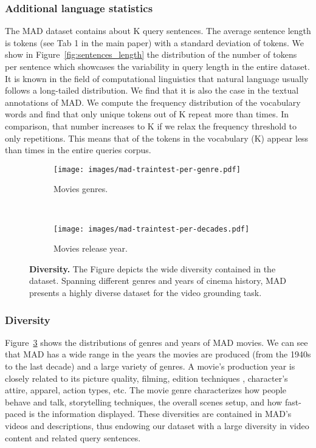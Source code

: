 \documentclass[10pt,twocolumn,letterpaper]{article}
\begin{document}
\subsubsection{Additional language statistics}
The MAD dataset contains about K query sentences. The average sentence length is  tokens (see Tab 1 in the main paper) with a standard deviation of  tokens. 
We show in Figure~\ref{fig:sentences_length} the distribution of the number of tokens per sentence which showcases the variability in query length in the entire dataset.
It is known in the field of computational linguistics that natural language usually follows a long-tailed distribution. We find that it is also the case in the textual annotations of MAD. We compute the frequency distribution of the vocabulary words and find that only  unique tokens out of K repeat more than  times. In comparison, that number increases to K if we relax the frequency threshold to only  repetitions. This means that  of the tokens in the vocabulary (K) appear less than  times in the entire queries corpus. 

\begin{figure}[t]
    \vspace{-0.5cm}
    \centering
    \begin{subfigure}[t]{0.8\linewidth}
        \centering
        \texttt{[image: images/mad-traintest-per-genre.pdf]}
        \caption{Movies genres.}
        \label{fig:genres}
    \end{subfigure}\\
    \begin{subfigure}[t]{0.8\linewidth}
        \centering
        \texttt{[image: images/mad-traintest-per-decades.pdf]}
        \caption{Movies release year.}
        \label{fig:years}
    \end{subfigure}\caption{\textbf{Diversity.} The Figure depicts the wide diversity contained in the dataset. Spanning  different genres and  years of cinema history, MAD presents a highly diverse dataset for the video grounding task. }
    \label{fig:dataset-statistics-supp}
    \vspace{-0.5cm}
\end{figure} 
\subsubsection{Diversity}
Figure~\ref{fig:dataset-statistics-supp} shows the distributions of genres and years of MAD movies. We can see that MAD has a wide range in the years the movies are produced (from the 1940s to the last decade) and a large variety of genres. A movie's production year is closely related to its picture quality, filming, edition techniques \cite{pardo2021moviecuts}, character's attire, apparel, action types, etc. The movie genre characterizes how people behave and talk, storytelling techniques, the overall scenes setup, and how fast-paced is the information displayed. These diversities are contained in MAD's videos and descriptions, thus endowing our dataset with a large diversity in video content and related query sentences. 
     
\end{document}
